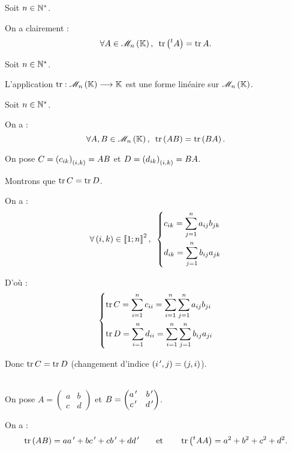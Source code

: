 \begin{rem}
Soit \(n\in\mathbb{N}^*\).

On a clairement : \[\quantifs{\forall A\in\M{n}}\tr\paren{\trans{A}}=\tr A.\]
\end{rem}

\begin{prop}
Soit \(n\in\mathbb{N}^*\).

L'application \(\tr:\M{n}\to\K\) est une forme linéaire sur \(\M{n}\).
\end{prop}

\begin{prop}
Soit \(n\in\mathbb{N}^*\).

On a : \[\quantifs{\forall A,B\in\M{n}}\tr\paren{AB}=\tr\paren{BA}.\]
\end{prop}

\begin{dem}
On pose \(C=\left(c_{ik}\right)_{\left(i,k\right)}=AB\) et \(D=\left(d_{ik}\right)_{\left(i,k\right)}=BA\).

Montrons que \(\operatorname{tr} C=\operatorname{tr} D\).

On a : \[\quantifs{\forall\paren{i,k}\in\interventierii{1}{n}^2}\begin{dcases}
c_{ik}=\sum_{j=1}^na_{ij}b_{jk} \\
d_{ik}=\sum_{j=1}^nb_{ij}a_{jk}
\end{dcases}\]

D'où : \[\begin{dcases}
\operatorname{tr} C=\sum_{i=1}^nc_{ii}=\sum_{i=1}^n\sum_{j=1}^na_{ij}b_{ji} \\
\operatorname{tr} D=\sum_{i=1}^nd_{ii}=\sum_{i=1}^n\sum_{j=1}^nb_{ij}a_{ji}
\end{dcases}\]

Donc \(\operatorname{tr} C=\operatorname{tr} D\) (changement d'indice \(\left(i^{\,\prime},j\right)=\left(j,i\right)\)).
\end{dem}

\begin{ex}~\\
On pose \(A=\begin{pmatrix}
a & b \\
c & d
\end{pmatrix}\) et \(B=\begin{pmatrix}
a^{\,\prime} & b^{\,\prime} \\
c^{\,\prime} & d^{\,\prime}
\end{pmatrix}\).

On a : \[\operatorname{tr}\left(AB\right)=aa^{\,\prime}+bc^{\,\prime}+cb^{\,\prime}+dd^{\,\prime}\qquad\text{et}\qquad\operatorname{tr}\left(\prescript{t}{}{A}A\right)=a^2+b^2+c^2+d^2.\]
\end{ex}

